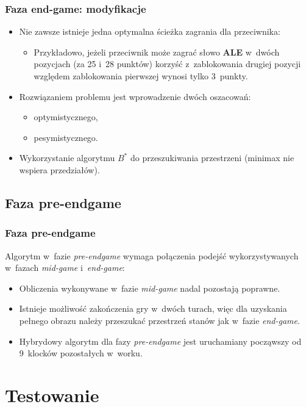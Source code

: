 \documentclass[10pt,a4paper]{beamer}
\begin{document}
\begin{frame}
	\frametitle{Faza end-game: modyfikacje}
	
	\begin{itemize}
		\item Nie zawsze istnieje jedna optymalna ścieżka zagrania dla przeciwnika:
		\begin{itemize}
			\item Przykładowo, jeżeli przeciwnik może zagrać słowo \textbf{ALE} w~dwóch pozycjach (za 25 i~28 punktów) korzyść z~zablokowania drugiej pozycji względem zablokowania pierwszej  wynosi tylko 3~punkty.
		\end{itemize}
		\item Rozwiązaniem problemu jest wprowadzenie dwóch oszacowań:
		\begin{itemize}
			\item optymistycznego,
			\item pesymistycznego.
		\end{itemize}
		\item Wykorzystanie algorytmu $B^{*}$ do przeszukiwania przestrzeni (minimax nie wspiera przedziałów).
	\end{itemize}
\end{frame}

\subsection{Faza pre-endgame}

\begin{frame}
	\frametitle{Faza pre-endgame}
	
	Algorytm w~fazie \emph{pre-endgame} wymaga połączenia podejść wykorzystywanych w~fazach \emph{mid-game} i~\emph{end-game}:

	\begin{itemize}
		\item Obliczenia wykonywane w~fazie \emph{mid-game} nadal pozostają poprawne.
		\item Istnieje możliwość zakończenia gry w~dwóch turach, więc dla uzyskania pełnego obrazu należy przeszukać przestrzeń stanów jak w~fazie \emph{end-game}.
		\item Hybrydowy algorytm dla fazy \emph{pre-endgame} jest uruchamiany począwszy od 9~klocków pozostałych w~worku.
	\end{itemize}
\end{frame}

\section{Testowanie}
\end{document}

